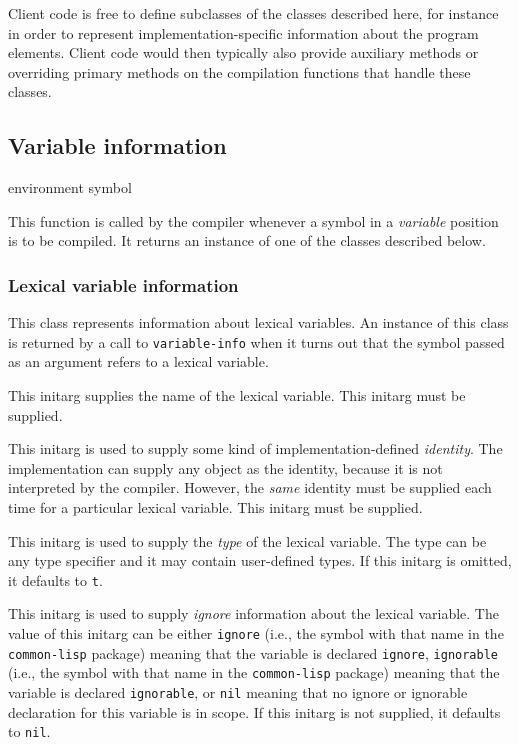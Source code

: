 Client code is free to define subclasses of the classes described
here, for instance in order to represent implementation-specific
information about the program elements.  Client code would then
typically also provide auxiliary methods or overriding primary methods
on the compilation functions that handle these classes.

\subsection{Variable information}

 {environment symbol}

This function is called by the compiler whenever a symbol in a
\emph{variable} position is to be compiled.  It returns an instance of
one of the classes described below.

\subsubsection{Lexical variable information}


This class represents information about lexical variables.  An
instance of this class is returned by a call to \texttt{variable-info}
when it turns out that the symbol passed as an argument refers to a
lexical variable.


This initarg supplies the name of the lexical variable.  This initarg
must be supplied. 


This initarg is used to supply some kind of implementation-defined 
\emph{identity}.  The implementation can supply any object as the
identity, because it is not interpreted by the compiler.  However, the
\emph{same} identity must be supplied each time for a particular
lexical variable.  This initarg must be supplied. 


This initarg is used to supply the \emph{type} of the lexical
variable.  The type can be any type specifier and it may contain
user-defined types.  If this initarg is omitted, it defaults to
\texttt{t}. 


This initarg is used to supply \emph{ignore} information about the
lexical variable.  The value of this initarg can be either
\texttt{ignore} (i.e., the symbol with that name in the
\texttt{common-lisp} package) meaning that the variable is declared
\texttt{ignore}, \texttt{ignorable} (i.e., the symbol with that name
in the \texttt{common-lisp} package) meaning that the variable is
declared \texttt{ignorable}, or \texttt{nil} meaning that no ignore or
ignorable declaration for this variable is in scope.  If this initarg
is not supplied, it defaults to \texttt{nil}.

